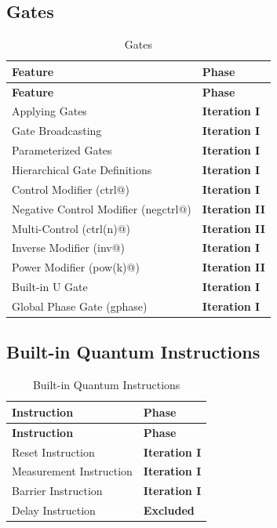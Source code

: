 \subsection{Gates}
\begin{longtable}{@{}p{10cm}l@{}}
\caption{Gates}\label{tab:gates}\\
\toprule
\textbf{Feature} & \textbf{Phase} \\
\midrule
\endfirsthead
\toprule
\textbf{Feature} & \textbf{Phase} \\
\midrule
\endhead
Applying Gates & \textbf{Iteration I} \\
Gate Broadcasting & \textbf{Iteration I} \\
Parameterized Gates & \textbf{Iteration I} \\
Hierarchical Gate Definitions & \textbf{Iteration I} \\
Control Modifier (ctrl@) & \textbf{Iteration I} \\
Negative Control Modifier (negctrl@) & \textbf{Iteration II} \\
Multi-Control (ctrl(n)@) & \textbf{Iteration II} \\
Inverse Modifier (inv@) & \textbf{Iteration I} \\
Power Modifier (pow(k)@) & \textbf{Iteration II} \\
Built-in U Gate & \textbf{Iteration I} \\
Global Phase Gate (gphase) & \textbf{Iteration I} \\
\bottomrule
\end{longtable}

\subsection{Built-in Quantum Instructions}
\begin{longtable}{@{}p{10cm}l@{}}
\caption{Built-in Quantum Instructions}\label{tab:quantum-instr}\\
\toprule
\textbf{Instruction} & \textbf{Phase} \\
\midrule
\endfirsthead
\toprule
\textbf{Instruction} & \textbf{Phase} \\
\midrule
\endhead
Reset Instruction & \textbf{Iteration I} \\
Measurement Instruction & \textbf{Iteration I} \\
Barrier Instruction & \textbf{Iteration I} \\
Delay Instruction & \textbf{Excluded} \\
\bottomrule
\end{longtable}

